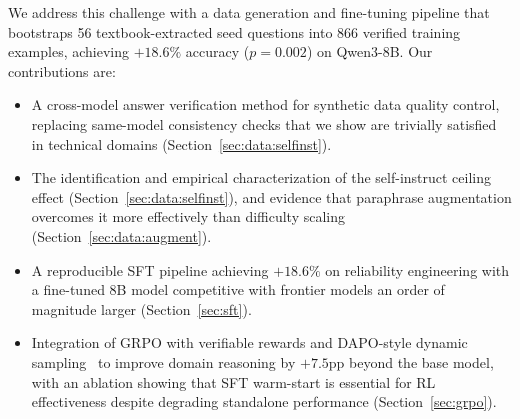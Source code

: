 We address this challenge with a data generation and fine-tuning pipeline that bootstraps 56 textbook-extracted seed questions into 866 verified training examples, achieving $+18.6\%$ accuracy ($p=0.002$) on Qwen3-8B. Our contributions are:
\begin{itemize}
    \item A cross-model answer verification method for synthetic data quality control, replacing same-model consistency checks that we show are trivially satisfied in technical domains (Section~\ref{sec:data:selfinst}).
    \item The identification and empirical characterization of the self-instruct ceiling effect (Section~\ref{sec:data:selfinst}), and evidence that paraphrase augmentation overcomes it more effectively than difficulty scaling (Section~\ref{sec:data:augment}).
    \item A reproducible SFT pipeline achieving $+18.6\%$ on reliability engineering with a fine-tuned 8B model competitive with frontier models an order of magnitude larger (Section~\ref{sec:sft}).
    \item Integration of GRPO with verifiable rewards and DAPO-style dynamic sampling~\cite{yu2025dapo} to improve domain reasoning by $+7.5$pp beyond the base model, with an ablation showing that SFT warm-start is essential for RL effectiveness despite degrading standalone performance (Section~\ref{sec:grpo}).
\end{itemize}
